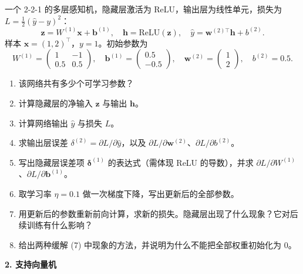 一个 2-2-1 的多层感知机，隐藏层激活为 ReLU，输出层为线性单元，损失为 $L=\frac12(\hat y-y)^2$：
\[
\bm z=W^{(1)}\bm x+\bm b^{(1)},\quad \bm h=\mathrm{ReLU}(\bm z),\quad \hat y=\bm w^{(2)\top}\bm h+b^{(2)}.
\]
样本 $\bm x=(1,2)^\top$，$y=1$。初始参数为
\[
W^{(1)}=\begin{pmatrix}1&-1\\0.5&0.5\end{pmatrix},\quad
\bm b^{(1)}=\begin{pmatrix}0.5\\-0.5\end{pmatrix},\quad
\bm w^{(2)}=\begin{pmatrix}1\\2\end{pmatrix},\quad b^{(2)}=0.5 .
\]
\begin{enumerate}[label=(\arabic*)]
\item 该网络共有多少个可学习参数？
\item 计算隐藏层的净输入 $\bm z$ 与输出 $\bm h$。
\item 计算网络输出 $\hat y$ 与损失 $L$。
\item 求输出层误差 $\delta^{(2)}=\partial L/\partial\hat y$，以及 $\partial L/\partial\bm w^{(2)}$、$\partial L/\partial b^{(2)}$。
\item 写出隐藏层误差项 $\bm\delta^{(1)}$ 的表达式（需体现 ReLU 的导数），并求 $\partial L/\partial W^{(1)}$、$\partial L/\partial\bm b^{(1)}$。
\item 取学习率 $\eta=0.1$ 做一次梯度下降，写出更新后的全部参数。
\item 用更新后的参数重新前向计算，求新的损失。隐藏层出现了什么现象？它对后续训练有什么影响？
\item 给出两种缓解 (7) 中现象的方法，并说明为什么不能把全部权重初始化为 0。
\end{enumerate}

\bigskip
\noindent\textbf{2. 支持向量机}

